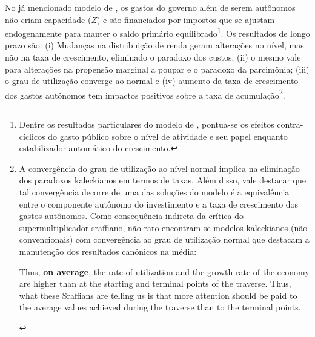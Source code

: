No já mencionado modelo de \textcite{allain_tackling_2015}, os gastos do governo além de serem autônomos não criam capacidade ($Z$) e são financiados por impostos que se ajustam endogenamente para manter o saldo primário equilibrado\footnote{
	Dentre os resultados particulares do modelo de \textcite{allain_tackling_2015}, pontua-se os efeitos contra-cíclicos do gasto público sobre o nível de atividade e seu papel enquanto estabilizador automático do crescimento.
}.  
Os resultados de longo prazo são:
	(i) Mudanças na distribuição de renda geram alterações no nível, mas não na taxa de crescimento, eliminado o paradoxo dos custos; 
	(ii) o mesmo vale para alterações na propensão marginal a poupar e o paradoxo da parcimônia; 
	(iii) o grau de utilização converge ao normal e 
	(iv) aumento da taxa de crescimento dos gastos autônomos tem impactos positivos sobre a taxa de acumulação\footnote{
		A convergência do grau de utilização ao nível normal implica na eliminação dos paradoxos kaleckianos em termos de taxas. Além disso, vale destacar que tal convergência decorre de uma das soluções do modelo é a equivalência entre o componente autônomo do investimento e a taxa de crescimento dos gastos autônomos. Como consequência indireta da crítica do supermultiplicador sraffiano, não raro encontram-se modelos kaleckianos (não-convencionais) com convergência ao grau de utilização normal que destacam a manutenção dos resultados canônicos na média:
	
		\begin{citacao}
			Thus, \textbf{on average}, the rate of utilization and the growth rate of the economy are higher than at the starting and terminal points of the traverse. Thus, what these Sraffians are telling us is that more attention should be paid to the average values
			achieved during the traverse than to the terminal points. \cite[p.~408, grifos adicionados]{lavoie_post-keynesian_2015}
	\end{citacao}
	
}.


